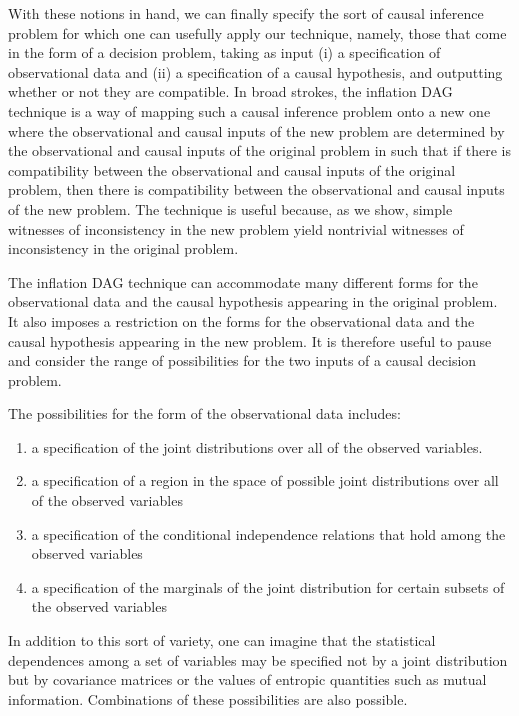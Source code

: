 

With these notions in hand, we can finally specify the sort of causal inference problem for which one can usefully apply our technique, namely, those that come in the form of a decision problem, taking as input (i) a specification of observational data and (ii) a specification of a causal hypothesis, and outputting whether or not they are compatible.  In broad strokes, the inflation DAG technique is a way of mapping such a causal inference problem onto a new one where the observational and causal inputs of the new problem are determined by the observational and causal inputs of the original problem in such that if there is compatibility between the observational and causal inputs of the original problem, then there is compatibility between the observational and causal inputs of the new problem.  The technique is useful because, as we show, simple witnesses of inconsistency in the new problem yield nontrivial witnesses of inconsistency in the original problem. 


The inflation DAG technique can accommodate many different forms for the observational data and the causal hypothesis appearing in the original problem.  It also imposes a restriction on the forms for the observational data and the causal hypothesis appearing in the new problem.  It is therefore useful to pause and consider the range of possibilities for the two inputs of a causal decision problem. 

The possibilities for the form of the observational data includes:
\begin{enumerate}
\item a specification of the joint distributions over all of the observed variables.
\item a specification of a region in the space of possible joint distributions over all of the observed variables
\item a specification of the conditional independence relations that hold among the observed variables
\item a specification of the marginals of the joint distribution for certain subsets of the observed variables
\end{enumerate}
In addition to this sort of variety, one can imagine that the statistical dependences among a set of variables may be specified not by a joint distribution but by covariance matrices or the values of entropic quantities such as mutual information.  Combinations of these possibilities are also possible.

